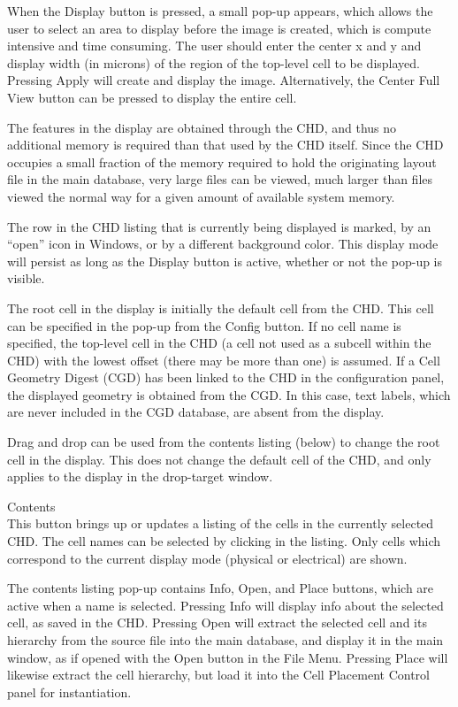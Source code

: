 \begin{description}
When the {\cb Display} button is pressed, a small pop-up appears,
which allows the user to select an area to display before the image is
created, which is compute intensive and time consuming.  The user
should enter the center x and y and display width (in microns) of the
region of the top-level cell to be displayed.  Pressing {\cb Apply}
will create and display the image.  Alternatively, the {\cb Center
Full View} button can be pressed to display the entire cell.

The features in the display are obtained through the CHD, and thus no
additional memory is required than that used by the CHD itself.  Since
the CHD occupies a small fraction of the memory required to hold the
originating layout file in the main database, very large files can be
viewed, much larger than files viewed the normal way for a given
amount of available system memory.

The row in the CHD listing that is currently being displayed is
marked, by an ``open'' icon in Windows, or by a different background
color.  This display mode will persist as long as the {\cb Display}
button is active, whether or not the pop-up is visible.

The root cell in the display is initially the default cell from the
CHD.  This cell can be specified in the pop-up from the {\cb Config}
button.  If no cell name is specified, the top-level cell in the CHD
(a cell not used as a subcell within the CHD) with the lowest offset
(there may be more than one) is assumed.  If a Cell Geometry Digest
(CGD) has been linked to the CHD in the configuration panel, the
displayed geometry is obtained from the CGD.  In this case, text
labels, which are never included in the CGD database, are absent from
the display.

Drag and drop can be used from the contents listing (below) to change
the root cell in the display.  This does not change the default cell
of the CHD, and only applies to the display in the drop-target window.

\item{\cb Contents}\\
This button brings up or updates a listing of the cells in the
currently selected CHD.  The cell names can be selected by clicking in
the listing.  Only cells which correspond to the current display mode
(physical or electrical) are shown.

The contents listing pop-up contains {\cb Info}, {\cb Open}, and {\cb
Place} buttons, which are active when a name is selected.  Pressing
{\cb Info} will display info about the selected cell, as saved in the
CHD.  Pressing {\cb Open} will extract the selected cell and its
hierarchy from the source file into the main database, and display it
in the main window, as if opened with the {\cb Open} button in the
{\cb File Menu}.  Pressing {\cb Place} will likewise extract the cell
hierarchy, but load it into the {\cb Cell Placement Control} panel for
instantiation.


\end{description}
